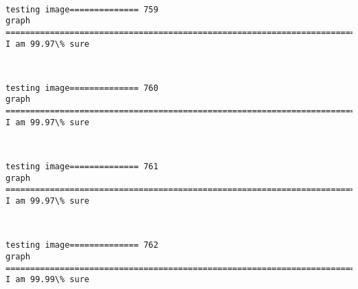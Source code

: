 \documentclass[11pt]{article}
\begin{document}
    \begin{center}
    \end{center}
    { \hspace*{\fill} \\}
    
    \begin{Verbatim}[commandchars=\\\{\}]
testing image============== 759
graph
============================================================================
I am 99.97\% sure

    \end{Verbatim}

    \begin{center}
    \end{center}
    { \hspace*{\fill} \\}
    
    \begin{Verbatim}[commandchars=\\\{\}]
testing image============== 760
graph
============================================================================
I am 99.97\% sure

    \end{Verbatim}

    \begin{center}
    \end{center}
    { \hspace*{\fill} \\}
    
    \begin{Verbatim}[commandchars=\\\{\}]
testing image============== 761
graph
============================================================================
I am 99.97\% sure

    \end{Verbatim}

    \begin{center}
    \end{center}
    { \hspace*{\fill} \\}
    
    \begin{Verbatim}[commandchars=\\\{\}]
testing image============== 762
graph
============================================================================
I am 99.99\% sure

    \end{Verbatim}
\end{document}
